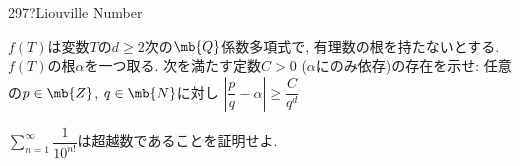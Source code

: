 \begin{prob}{297}{\hosi ?}{Liouville Number}
    \ben
    \item $f(T)$は変数$T$の$d\geq 2$次の$\mb{Q}$係数多項式で, 有理数の根を持たないとする. $f(T)$の根$\alpha$を一つ取る. 次を満たす定数$C>0$ ($\alpha$にのみ依存)の存在を示せ: 任意の$p\in \mb{Z}$, $q\in \mb{N}$に対し $\left|\dfrac{p}{q} - \alpha\right| \geq \dfrac{C}{q^d}$
    \item $\sum_{n=1}^{\infty} \dfrac{1}{10^{n!}}$は超越数であることを証明せよ.
    \een
\end{prob}
